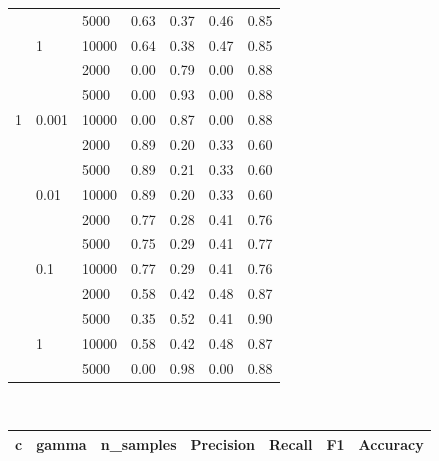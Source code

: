 \documentclass[a4paper,10pt]{article}
\begin{document}
\begin{table}[!ht]
\begin{multicols}{2}
\begin{scriptsize}
\begin{tabular}{|lllrrrr|}
      &       & 5000 &       0.63 &       0.37 &       0.46 &       0.85 \\
      & 1 & 10000 &       0.64 &       0.38 &       0.47 &       0.85 \\
      &       & 2000 &       0.00 &       0.79 &       0.00 &       0.88 \\
      &       & 5000 &       0.00 &       0.93 &       0.00 &       0.88 \\
1 & 0.001 & 10000 &       0.00 &       0.87 &       0.00 &       0.88 \\
      &       & 2000 &       0.89 &       0.20 &       0.33 &       0.60 \\
      &       & 5000 &       0.89 &       0.21 &       0.33 &       0.60 \\
      & 0.01 & 10000 &       0.89 &       0.20 &       0.33 &       0.60 \\
      &       & 2000 &       0.77 &       0.28 &       0.41 &       0.76 \\
      &       & 5000 &       0.75 &       0.29 &       0.41 &       0.77 \\
      & 0.1 & 10000 &       0.77 &       0.29 &       0.41 &       0.76 \\
      &       & 2000 &       0.58 &       0.42 &       0.48 &       0.87 \\
      &       & 5000 &       0.35 &       0.52 &       0.41 &       0.90 \\
      & 1 & 10000 &       0.58 &       0.42 &       0.48 &       0.87 \\
      &       & 5000 &       0.00 &       0.98 &       0.00 &       0.88 \\
 \bottomrule
\end{tabular}     
\\
\begin{tabular}{|lllrrrr|}
\toprule
   c   &   gamma    &  n\_samples     &  Precision &     Recall &         F1 &   Accuracy \\
\midrule


\end{tabular}
\end{scriptsize}
\end{multicols}
\end{table}
\end{document}
